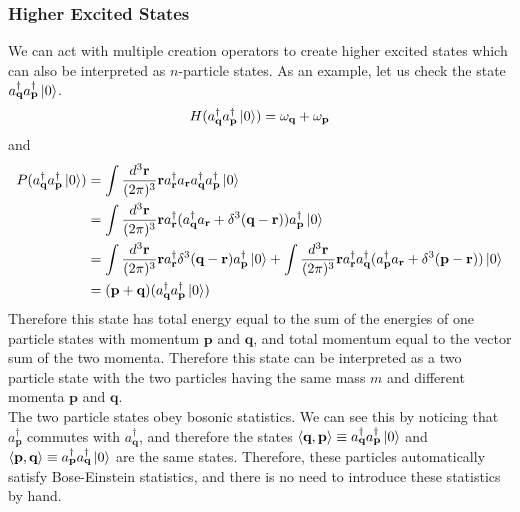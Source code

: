 \documentclass[11pt, notitlepage]{report}
\newcommand{\w}{\omega}
\numberwithin{equation}{section}
\begin{document}
    \subsubsection{Higher Excited States}
    We can act with multiple creation operators to create higher excited states which can also be interpreted as \(n\)-particle states. As an example, let us check the state \(a^\dagger_\textbf{q}a^\dagger_\textbf{p}\ket{0}\). 
    \begin{equation*}
        H(a^\dagger_\textbf{q}a^\dagger_\textbf{p}\ket{0}) = \w_\textbf{q} + \w_\textbf{p}
    \end{equation*}
    and 
    \begin{align*}
        P(a^\dagger_\textbf{q}a^\dagger_\textbf{p}\ket{0}) &= \int \frac{d^3\textbf{r}}{(2\pi)^3}\textbf{r}a^\dagger_\textbf{r}a_\textbf{r}a^\dagger_\textbf{q}a^\dagger_\textbf{p}\ket{0} \\
        &=\int \frac{d^3\textbf{r}}{(2\pi)^3}\textbf{r}a^\dagger_\textbf{r}( a^\dagger_\textbf{q}a_\textbf{r} +\delta^3(\textbf{q} - \textbf{r}) )a^\dagger_\textbf{p}\ket{0} \\
        &=\int \frac{d^3\textbf{r}}{(2\pi)^3}\textbf{r}a^\dagger_\textbf{r}\delta^3(\textbf{q} - \textbf{r})a^\dagger_\textbf{p}\ket{0}  + \int \frac{d^3\textbf{r}}{(2\pi)^3}\textbf{r}a^\dagger_\textbf{r}a^\dagger_\textbf{q}(a^\dagger_\textbf{p} a_\textbf{r} + \delta^3(\textbf{p} - \textbf{r}))\ket{0} \\
        &= (\textbf{p} + \textbf{q})(a^\dagger_\textbf{q}a^\dagger_\textbf{p}\ket{0} )
    \end{align*}
    Therefore this state has total energy equal to the sum of the energies of one particle states with momentum \(\textbf{p}\) and \(\textbf{q}\), and total momentum equal to the vector sum of the two momenta. Therefore this state can be interpreted as a two particle state with the two particles having the same mass \(m\) and different momenta \(\textbf{p}\) and \(\textbf{q}\).\\

    The two particle states obey bosonic statistics. We can see this by noticing that \(a^\dagger_\textbf{p}\) commutes with \(a^\dagger_\textbf{q}\), and therefore the states \(\braket{\textbf{q}, \textbf{p}}\equiv a^\dagger_\textbf{q}a^\dagger_\textbf{p}\ket{0}\) and \(\braket{\textbf{p}, \textbf{q}} \equiv a^\dagger_\textbf{p}a^\dagger_\textbf{q}\ket{0}\) are the same states. Therefore, these particles automatically satisfy Bose-Einstein statistics, and there is no need to introduce these statistics by hand.\\
\end{document}
